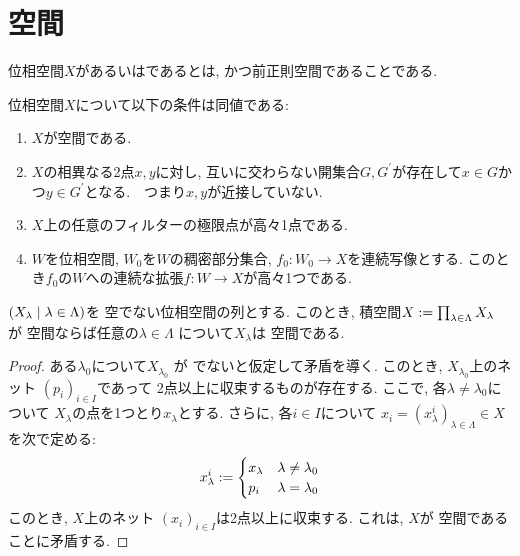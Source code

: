 \documentclass[uplatex, dvipdfmx, a4paper, 12pt, class=jsbook, crop=false]{standalone}
\begin{document}
\section{\Hausdorff 空間}
\label{sec:Hausdorff-spaces}

\begin{definition}
	位相空間$ X $があるいはであるとは, かつ前正則空間であることである.
\end{definition}

\begin{proposition}
	\label{T200001}
	位相空間$ X $について以下の条件は同値である:
	\begin{enumerate}
		\item $ X $が空間である.
		\item $ X $の相異なる2点$ x, y $に対し, 互いに交わらない開集合$ G, G^\prime $が存在して$ x \in G$かつ$ y \in G^\prime $となる.　つまり$ x, y $が近接していない.
		\item $ X $上の任意のフィルターの極限点が高々1点である.
		\item $ W $を位相空間, $ W_0 $を$ W $の稠密部分集合, $ f_0 \colon W_0 \rightarrow X $を連続写像とする. このとき$ f_0 $の$ W $への連続な拡張$ f \colon W \rightarrow X$が高々1つである.
	\end{enumerate}
\end{proposition}

\begin{proposition}
	\label{T200002}
	\( \setfamily{X_\lambda}{\lambda \in \Lambda} \)を
	空でない位相空間の列とする.
	このとき, 積空間\( X \mathrel{:=} \prod_{\lambda \in \Lambda} X_\lambda \)
	が \Hausdorff 空間ならば任意の\( \lambda \in \Lambda \)
	について\( X_\lambda \)は \Hausdorff 空間である.
\end{proposition}

\begin{proof}
	ある\( \lambda_0 \)について\( X_{\lambda_0} \)
	が \Hausdorff でないと仮定して矛盾を導く.
	このとき, \( X_{\lambda_0} \)上のネット
	\( (p_i)_{i \in I} \)であって
	2点以上に収束するものが存在する.
	ここで, 各\( \lambda \neq \lambda_0 \)について
	\( X_\lambda \)の点を1つとり\( x_\lambda \)とする.
	さらに, 各\( i \in I \)について
	\( x_i = (x^i_\lambda)_{\lambda \in \Lambda} \in X \)
	を次で定める:
	\[ x^i_\lambda \mathrel{:=} \begin{cases}
		x_\lambda & \lambda \neq \lambda_0 \\
		p_i & \lambda =\lambda_0
	\end{cases} \]
	このとき, \( X \)上のネット
	\( (x_i)_{i \in I} \)は2点以上に収束する.
	これは, \( X \)が \Hausdorff 空間であることに矛盾する.
\end{proof}
\end{document}
